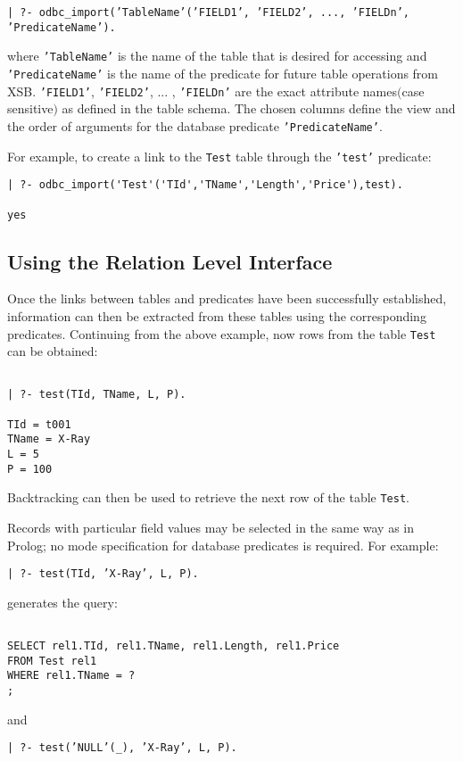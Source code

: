 \begin{center}
{\tt | ?- odbc\_import('TableName'('FIELD1', 'FIELD2', ..., 'FIELDn', 'PredicateName').}
\end{center}

where {\tt 'TableName'} is the name of the table that is desired for accessing
and {\tt 'PredicateName'} is the name of the predicate for future table operations 
from XSB. {\tt 'FIELD1'}, {\tt 'FIELD2'}, ... , {\tt 'FIELDn'} are
the exact attribute names$($case sensitive$)$ as defined in the table schema.  The
chosen columns define the view and the order of arguments for the
database predicate {\tt 'PredicateName'}.  
 
For example, to create a link to the {\tt  Test} table through the {\tt 'test'} predicate:
\begin{verbatim}
| ?- odbc_import('Test'('TId','TName','Length','Price'),test).

yes
\end{verbatim}

\subsection{Using the Relation Level Interface}

Once the links between tables and predicates have been successfully established, 
information can then be extracted from these tables using the corresponding 
predicates.   Continuing from the above example, now rows from the table 
{\tt Test} can be obtained:
 \begin{verbatim}

| ?- test(TId, TName, L, P).

TId = t001
TName = X-Ray
L = 5
P = 100 
\end{verbatim}

Backtracking can then be used to retrieve the next row of the table {\tt Test}.

Records with particular field values may be selected in the same way
as in Prolog; no mode specification for database predicates is
required. For example:
\begin{center}

{\tt | ?- test(TId, 'X-Ray', L, P).}
\end{center}
generates the query:
\begin{verbatim}

SELECT rel1.TId, rel1.TName, rel1.Length, rel1.Price
FROM Test rel1
WHERE rel1.TName = ?
;
\end{verbatim}
and 
\begin{center}

{\tt | ?- test('NULL'(\_), 'X-Ray',  L, P).}
\end{center}

